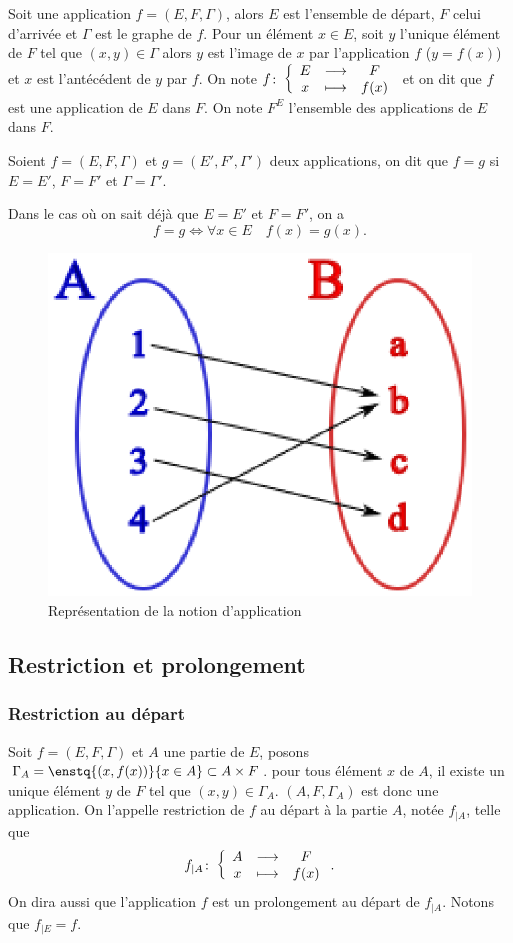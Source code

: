 Soit une application $f=(E,F,\Gamma)$, alors $E$ est l'ensemble de départ, $F$ celui d'arrivée et $\Gamma$ est le graphe de $f$. Pour un élément $x \in E$, soit $y$ l'unique élément de $F$ tel que $(x,y) \in \Gamma$ alors $y$ est l'image de $x$ par l'application $f$ ($y=f(x)$) et $x$ est l'antécédent de $y$ par $f$. On note $f\colon \left\{\begin{array}{ccc} E & \longrightarrow &F\\ x & \longmapsto & f(x) \end{array} \right.$ et on dit que $f$ est une application de $E$ dans $F$. On note $F^E$ l'ensemble des applications de $E$ dans $F$.
%
\begin{defdef}
  Soient $f=(E,F,\Gamma)$ et $g=(E',F',\Gamma')$ deux applications, on dit que $f=g$ si $E=E'$, $F=F'$ et $\Gamma=\Gamma'$.
\end{defdef}
Dans le cas où on sait déjà que $E=E'$ et $F=F'$, on a
\begin{equation}
  f=g \iff \forall x \in E \quad f(x)=g(x).
\end{equation}
%
\begin{figure}
  \centering
  \includegraphics[scale=0.7]{application.eps}
  \caption{Représentation de la notion d'application}
  \label{chap3-fig:application}
\end{figure}
%
\subsection{Restriction et prolongement}
\label{chap3-restrictionetprolongement}
\subsubsection{Restriction au départ} 
\label{chap3-subsubsec:restrictiondep}
Soit $f=(E,F,\Gamma)$ et $A$ une partie de $E$, posons $\Gamma_A=\enstq{(x,f(x))}{x \in A} \subset A \times F$. pour tous élément $x$ de $A$, il existe un unique élément $y$ de $F$ tel que $(x,y) \in \Gamma_A$. $(A,F, \Gamma_A)$ est donc une application. On l'appelle restriction de $f$ au départ à la partie $A$, notée $f_{|A}$, telle que
\begin{equation}
f_{|A}\colon \left\{\begin{array}{ccc} A & \longrightarrow &F\\ x & \longmapsto & f(x) \end{array} \right..
\end{equation}
On dira aussi que l'application $f$ est un prolongement au départ de $f_{|A}$. Notons que $f_{|E}=f$.
%
